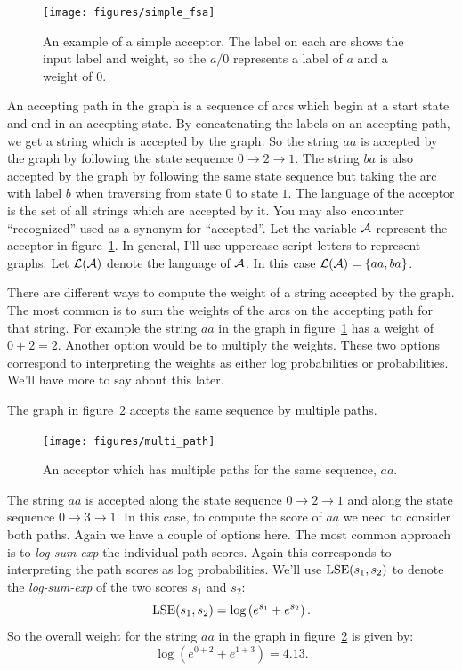 \begin{figure}
    \centering
    \texttt{[image: figures/simple\_fsa]}
    \caption{An example of a simple acceptor. The label on each arc shows the
    input label and weight, so the $a/0$ represents a label of $a$ and a weight
    of $0$.}
    \label{fig:simple_fsa}
\end{figure}

An accepting path in the graph is a sequence of arcs which begin at a start
state and end in an accepting state. By concatenating the labels on an
accepting path, we get a string which is accepted by the graph. So the string
$aa$ is accepted by the graph by following the state sequence $0 \rightarrow 2
\rightarrow 1$. The string $ba$ is also accepted by the graph by following the
same state sequence but taking the arc with label $b$ when traversing from
state $0$ to state $1$. The language of the acceptor is the set of all strings
which are accepted by it. You may also encounter ``recognized'' used as a
synonym for ``accepted''. Let the variable $\mathcal{A}$ represent the acceptor in
figure~\ref{fig:simple_fsa}. In general, I'll use uppercase script letters to
represent graphs. Let $\mathcal{L}(\mathcal{A})$ denote the language of $\mathcal{A}$. In this
case $\mathcal{L}(\mathcal{A}) = \{aa, ba\}$.

There are different ways to compute the weight of a string accepted by the
graph. The most common is to sum the weights of the arcs on the accepting path
for that string. For example the string $aa$ in the graph in
figure~\ref{fig:simple_fsa} has a weight of $0 + 2 = 2$. Another option would
be to multiply the weights. These two options correspond to interpreting the
weights as either log probabilities or probabilities. We'll have more to say
about this later.

The graph in figure~\ref{fig:multi_path} accepts the same sequence by multiple
paths.

\begin{figure}
    \centering
    \texttt{[image: figures/multi\_path]}
    \caption{An acceptor which has multiple paths for the same sequence, $aa$.}
    \label{fig:multi_path}
\end{figure}

The string $aa$ is accepted along the state sequence $0 \rightarrow 2
\rightarrow 1$ and along the state sequence $0 \rightarrow 3 \rightarrow 1$. In
this case, to compute the score of $aa$ we need to consider both paths. Again
we have a couple of options here. The most common approach is to
\emph{log-sum-exp} the individual path scores. Again this corresponds to
interpreting the path scores as log probabilities. We'll use $\operatorname*{\textrm{LSE}}(s_1, s_2)$
to denote the \emph{log-sum-exp} of the two scores $s_1$ and $s_2$:
\begin{equation}
\operatorname*{\textrm{LSE}}(s_1, s_2) = \log \left( e^{s_1} + e^{s_2}\right).
\end{equation}
So the overall weight for the string $aa$ in the graph in
figure~\ref{fig:multi_path} is given by:
$$
\log \left(e^{0 + 2} + e^{1 + 3}\right) = 4.13.
$$

